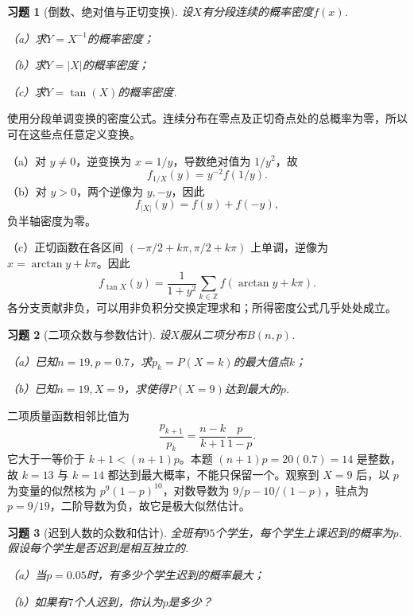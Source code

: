 \documentclass[UTF8,12pt,a4paper,fontset=fandol]{ctexart}
\newtheorem{exercise}{习题}[section]
\begin{document}
\begin{exercise}[倒数、绝对值与正切变换]\label{q:Y3.20}
设$X$有分段连续的概率密度$f(x)$.

（a）求$Y=X^{-1}$的概率密度；

（b）求$Y=|X|$的概率密度；

（c）求$Y=\tan(X)$的概率密度.\par{}
\end{exercise}

\begin{solve}\label{a:Y3.20}使用分段单调变换的密度公式。连续分布在零点及正切奇点处的总概率为零，所以可在这些点任意定义变换。\par（a）对 $y\ne0$，逆变换为 $x=1/y$，导数绝对值为 $1/y^2$，故\[f_{1/X}(y)=y^{-2}f(1/y).\]（b）对 $y>0$，两个逆像为 $y,-y$，因此\[f_{|X|}(y)=f(y)+f(-y),\]负半轴密度为零。\par（c）正切函数在各区间 $(-\pi/2+k\pi,\pi/2+k\pi)$ 上单调，逆像为 $x=\arctan y+k\pi$。因此\[f_{\tan X}(y)=\frac1{1+y^2}\sum_{k\in\mathbb Z}f(\arctan y+k\pi).\]各分支贡献非负，可以用非负积分交换定理求和；所得密度公式几乎处处成立。\end{solve}

\begin{exercise}[二项众数与参数估计]\label{q:Y3.21}
设$X$服从二项分布$B(n,p)$.

（a）已知$n=19,p=0.7$，求$p_k=P(X=k)$的最大值点$k$；

（b）已知$n=19,X=9$，求使得$P(X=9)$达到最大的$p$.\par{}
\end{exercise}

\begin{solve}\label{a:Y3.21}二项质量函数相邻比值为\[\frac{p_{k+1}}{p_k}=\frac{n-k}{k+1}\frac{p}{1-p}.\]它大于一等价于 $k+1<(n+1)p$。本题 $(n+1)p=20(0.7)=14$ 是整数，故 $k=13$ 与 $k=14$ 都达到最大概率，不能只保留一个。观察到 $X=9$ 后，以 $p$ 为变量的似然核为 $p^9(1-p)^{10}$，对数导数为 $9/p-10/(1-p)$，驻点为 $p=9/19$，二阶导数为负，故它是极大似然估计。\end{solve}

\begin{exercise}[迟到人数的众数和估计]\label{q:Y3.22}
全班有$95$个学生，每个学生上课迟到的概率为$p$.假设每个学生是否迟到是相互独立的.

（a）当$p=0.05$时，有多少个学生迟到的概率最大；

（b）如果有$7$个人迟到，你认为$p$是多少？\par{}
\end{exercise}
\end{document}
